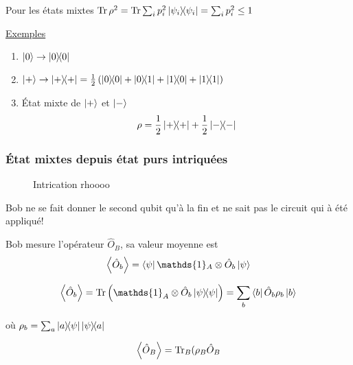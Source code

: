 Pour les états mixtes $\Tr \rho^{2} = \Tr \sum_i p_i^{2} \ketbra{\psi_{i}} = \sum_i p_i^{2}\leq 1$

\underline{Exemples} 

\begin{enumerate}
    \item $\ket{0} \to \ketbra{0}$
    \item $\ket{+} \to \ketbra{+} = \frac{1}{2} \left( \ketbra{0} + \ketbra{0}{1} + \ketbra{1}{0} + \ketbra{1} \right) $
    \item État mixte de $\ket{+}$ et $\ket{-}$
        \[ \rho = \frac{1}{2} \ketbra{+} + \frac{1}{2} \ketbra{-} \]
\end{enumerate}

\subsubsection{État mixtes depuis état purs intriquées}

\begin{figure}[ht]
    \centering
    \caption{Intrication rhoooo}
    \label{fig:intrication-rhoooo}
\end{figure}


Bob ne se fait donner le second qubit qu'à la fin et ne sait pas le circuit qui à été appliqué!

Bob mesure l'opérateur $\hat O_B$, sa valeur moyenne est \[ \expval{\hat O_{b}} = \bra{\psi} \mathds{1}_A \otimes \hat O_b \ket{\psi} \]


\[ \expval{\hat O_{b}} = \Tr \left( \mathds{1}_A \otimes \hat O_b \ketbra{\psi} \right) = \sum_b \bra{b} \hat O_b \rho_b \ket{b}  \]

où $\rho_b = \sum_a \ketbra{a}{\psi}\ketbra{\psi}{a}$

\[ \expval{\hat O_{B}} = \Tr_B(\rho_B \hat O_B \]



